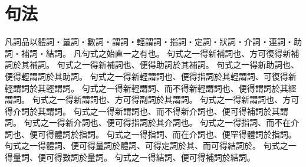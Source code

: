 \chapter{句法}
凡詞品以體詞・量詞・數詞・謂詞・輕謂詞・指詞・定詞・狀詞・介詞・連詞・助詞・補詞・結詞。
凡句式之始直一之有也。
句式之一得新補詞也、方可復得新補詞於其補詞。
句式之一得新補詞也、便得助詞於其補詞。
句式之一得新助詞也、便得輕謂詞於其助詞。
句式之一得新輕謂詞也、便得指詞於其輕謂詞、可復得新輕謂詞於其輕謂詞。
句式之一得新輕謂詞、而不得新輕謂詞也、便得謂詞於其經謂詞。
句式之一得新謂詞也、方可得副詞於其謂詞。
句式之一得新謂詞也、方可得介詞於其謂詞。
句式之一得新謂詞也、而不得新介詞也、便可得補詞於其謂詞。
句式之一得新介詞也、便可得指詞於其介詞也。
句式之一得指詞、而不在介詞也、便可得體詞於指詞。
句式之一得指詞、而在介詞也、便罕得體詞於指詞。
句式之一得體詞、便可得量詞於體詞、可得定詞於其、而可得結詞於。
句式之一得量詞、便可得數詞於量詞。
句式之一得結詞、便可得補詞於結詞。
